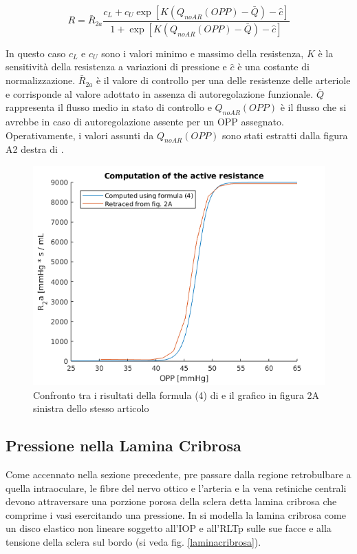 \documentclass{article}
\begin{document}
\begin{equation}
R = \bar{R}_{2a} \frac{c_L + c_U \exp \left[ K \left(Q_{noAR}(OPP) - \bar{Q}\right) - \hat{c}\right]}{1 + \exp \left[ K \left(Q_{noAR}(OPP) - \bar{Q}\right) - \hat{c}\right]}
\label{activeR}
\end{equation}

In questo caso $c_L$ e $c_U$ sono i valori minimo e massimo della resistenza, $K$ è la sensitività della resistenza a variazioni di pressione e $\hat{c}$ è una costante di normalizzazione.
$\bar{R}_{2a}$ è il valore di controllo per una delle resistenze delle arteriole e corrisponde al valore adottato in assenza di autoregolazione funzionale.
$\bar{Q}$ rappresenta il flusso medio in stato di controllo e $Q_{noAR}(OPP)$ è il flusso che si avrebbe in caso di autoregolazione assente per un OPP assegnato.
Operativamente, i valori assunti da $Q_{noAR}(OPP)$ sono stati estratti dalla figura A2 destra di \cite{art1}.

\begin{figure}[h]
\begin{center}
\includegraphics[width=1.0\textwidth]{Pictures/compare_R2a.png}
\caption{Confronto tra i risultati della formula (4) di \cite{art1} e il grafico in figura 2A sinistra dello stesso articolo}
\label{compare_active}
\end{center}
\end{figure}

\subsection{Pressione nella Lamina Cribrosa}
Come accennato nella sezione precedente, pre passare dalla regione retrobulbare a quella intraoculare, le fibre del nervo ottico e l'arteria e la vena retiniche centrali devono attraversare una porzione porosa della sclera detta lamina cribrosa che comprime i vasi esercitando una pressione.
In \cite{art3} si modella la lamina cribrosa come un disco elastico non lineare soggetto all'IOP e all'RLTp sulle sue facce e alla tensione della sclera sul bordo (si veda fig. \ref{laminacribrosa}).
\end{document}
